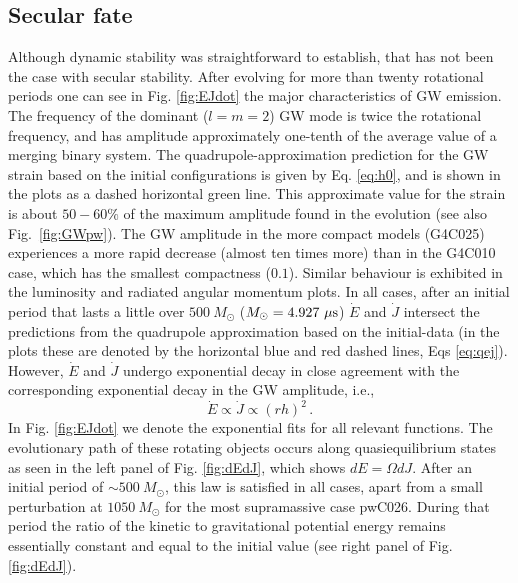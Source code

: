 \documentclass[twocolumn,superscriptaddress,showpacs,prd,aps,amsmath,amssymb,nofootinbib]{revtex4-1}
\newcommand{\be}{\begin{equation}}
\newcommand{\ee}{\end{equation}}
\begin{document}
\subsection{Secular fate}
\label{sec:secfate}

Although dynamic stability was straightforward to establish, that has
not been the case with secular stability. After evolving for more than
twenty rotational periods one can see in Fig.  \ref{fig:EJdot} the
major characteristics of GW emission. The frequency of
the dominant ($l=m=2$) GW mode is twice the rotational frequency, and
has amplitude approximately one-tenth of the
average value of a merging binary system. The
quadrupole-approximation prediction for the GW strain based on the
initial configurations is given by Eq. \ref{eq:h0}, and is shown in
the plots as a dashed horizontal green line. This approximate value
for the strain is about $50-60\%$ of the maximum amplitude found in
the evolution (see also Fig.~\ref{fig:GWpw}). The GW amplitude in the
more compact models (G4C025) experiences a more rapid decrease (almost
ten times more) than in the G4C010 case, which has the smallest
compactness ($0.1$). Similar behaviour is exhibited in the luminosity
and radiated angular momentum plots. In all cases, after an initial
period that lasts a little over $500\ M_\odot$ ($M_\odot=4.927\ {\rm
  \mu s}$) $\dot{E}$ and $\dot{J}$ intersect the predictions from the
quadrupole approximation based on the initial-data (in the plots these
are denoted by the horizontal blue and red dashed lines, Eqs
\ref{eq:qej}). However, $\dot{E}$ and $\dot{J}$ undergo exponential
decay in close agreement with the corresponding exponential decay in
the GW amplitude, i.e.,
%
\be 
\dot{E} \propto \dot{J} \propto (rh)^2 \, .  
\ee
%
In Fig. \ref{fig:EJdot} we denote the exponential fits for
all relevant functions.
The evolutionary path of these rotating objects occurs along
quasiequilibrium states as seen in the left panel of
Fig. \ref{fig:dEdJ}, which shows $dE=\Omega dJ$. After an initial
period of $\sim 500\ M_\odot$, this law is satisfied in all cases,
apart from a small perturbation at $1050\ M_\odot$ for the most
supramassive case pwC026. During that period the ratio of the kinetic
to gravitational potential energy remains essentially constant and
equal to the initial value (see right panel of Fig. \ref{fig:dEdJ}).
\end{document}
